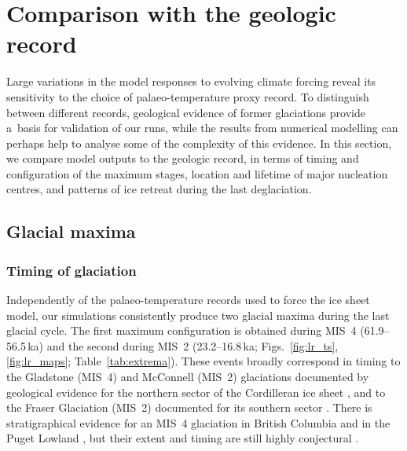 \documentclass[tc, manuscript]{copernicus}
\begin{document}
\section{Comparison with the geologic record}
\label{sec:discussion}

      Large variations in the model responses to evolving climate forcing
      reveal its sensitivity to the choice of palaeo-temperature proxy
      record. To distinguish between different records, geological evidence
      of former glaciations provide a~basis for validation of our runs,
      while the results from numerical modelling can perhaps help to analyse
      some of the complexity of this evidence. In this section, we compare
      model outputs to the geologic record, in terms of timing and
      configuration of the maximum stages, location and lifetime of major
      nucleation centres, and patterns of ice retreat during the last
      deglaciation.

\subsection{Glacial maxima}

\subsubsection{Timing of glaciation}
\label{sec:timing}

      Independently of the palaeo-temperature records used to force the ice
      sheet model, our simulations consistently produce two glacial maxima
      during the last glacial cycle. The first maximum configuration is
      obtained during MIS~4 (61.9--56.5\,\unit{ka}) and the second during
      MIS~2 (23.2--16.8\,\unit{ka}; Figs.~\ref{fig:lr_ts},
      \ref{fig:lr_maps}; Table~\ref{tab:extrema}). These events broadly
      correspond in timing to the Gladstone (MIS~4) and McConnell (MIS~2)
      glaciations documented by geological evidence for the northern sector
      of the Cordilleran ice sheet \citep{Duk-Rodkin.etal.1996,
      Ward.etal.2007, Stroeven.etal.2010, Stroeven.etal.2014}, and to the
      Fraser Glaciation (MIS~2) documented for its southern sector
      \citep{Porter.Swanson.1998, Margold.etal.2014}. There is
      stratigraphical evidence for an MIS~4 glaciation in British Columbia
      \citep{Clague.Ward.2011} and in the Puget Lowland \citep{Troost.2014},
      but their extent and timing are still highly conjectural
      \citep[perhaps MIS~4 or early MIS~3; e.g.,][]{Cosma.etal.2008}.
\end{document}
